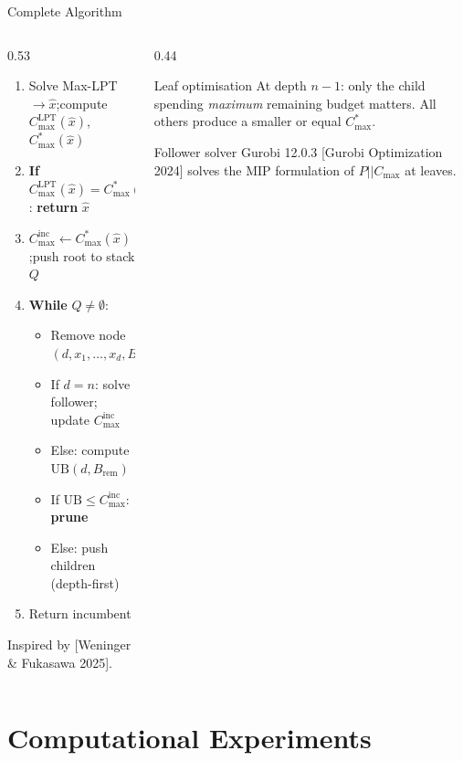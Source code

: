 \documentclass[fleqn,11pt,aspectratio=43]{beamer}
\newcommand{\Cmax}{C_{\max}}
\newcommand{\Copt}{C_{\max}^{*}}
\newcommand{\Clpt}{C_{\max}^{\mathrm{LPT}}}
\newcommand{\Cinc}{C_{\max}^{\mathrm{inc}}}
\newcommand{\Brem}{B_{\mathrm{rem}}}
\newcommand{\UB}{\mathrm{UB}}
\begin{document}
\begin{frame}[shrink=5]{Complete Algorithm}
  \begin{columns}[T]
    \begin{column}{0.53\textwidth}
      \small
      \begin{enumerate}
        \item Solve Max-LPT $\to\hat x$;\quad compute $\Clpt(\hat x)$, $\Copt(\hat x)$
        \item \textbf{If} $\Clpt(\hat x)=\Copt(\hat x)$: \textbf{return} $\hat x$
        \item $\Cinc\leftarrow\Copt(\hat x)$;\quad push root to stack $Q$
        \item \textbf{While} $Q\neq\emptyset$:
        \begin{itemize}\small
          \item Remove node $(d,x_1,\ldots,x_d,\Brem)$
          \item If $d=n$: solve follower; update $\Cinc$
          \item Else: compute $\UB(d,\Brem)$
          \item If $\UB\leq\Cinc$: \textbf{prune}
          \item Else: push children (depth-first)
        \end{itemize}
        \item Return incumbent
      \end{enumerate}
      \smallskip
      {\footnotesize Inspired by [Weninger \& Fukasawa 2025].}
    \end{column}
    \begin{column}{0.44\textwidth}
      \begin{block}{Leaf optimisation}
        \small At depth $n{-}1$: only the child spending \emph{maximum} remaining budget matters.
        All others produce a smaller or equal $\Copt$.
      \end{block}
      \begin{block}{Follower solver}
        \small Gurobi 12.0.3 [Gurobi Optimization 2024] solves the MIP formulation of $P||\Cmax$ at leaves.
      \end{block}
    \end{column}
  \end{columns}
\end{frame}

\section{Computational Experiments}
\end{document}
